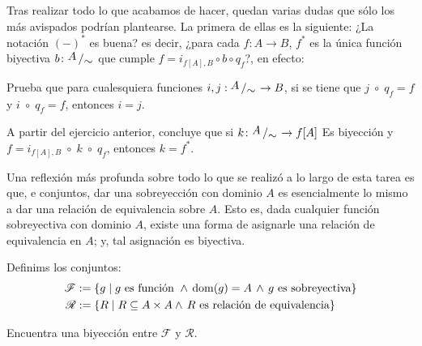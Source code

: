 \documentclass[letterpaper,DIV=14,headsepline,12pt]{scrartcl}
\newcommand{\pts}{}
\newenvironment{ejercicio}[1]{\ifthenelse{\equal{#1}{1} \OR
\equal{#1}{+1}}{\renewcommand{\pts}{\textbf{(#1
pt)}}}{\renewcommand{\pts}{\textbf{(#1 pts)}}}\begin{ejj}\upshape
\pts}{\end{ejj}}
\newcommand{\quot}[2]{{\raisebox{.2em}{$#1$}\left/\raisebox{-.2em}{$#2$}\right.}}
\begin{document}
    Tras realizar todo lo que acabamos de hacer, quedan varias dudas que sólo
    los más avispados podrían plantearse. La primera de ellas es la siguiente:
    ¿La notación $(-)^*$ es buena? es decir, ¿para cada $f\colon A \to B$, $f^*$ es la
    única función biyectiva $b\colon \quot{A}{\sim}$ que cumple $f=i_{f[A],B} \circ b
    \circ q_f$?, en efecto:

    \begin{ejercicio}{+1}
        Prueba que para cualesquiera funciones $i,j:\quot{A}{\sim}\to B$, si se tiene que 
        $ j \; \circ \; q_f = f$ y $ i  \; \circ \; q_f = f$, entonces $i=j$.
    \end{ejercicio}
    
    \begin{ejercicio}{+1}
        A partir del ejercicio anterior, concluye que si $k\colon \quot{A}{\sim} \to f[A]$ Es
        biyección y $f = i_{f[A],B} \; \circ \; k \; \circ \; q_f$, entonces $k=f^*$.
    \end{ejercicio}

    Una reflexión más profunda sobre todo lo que se realizó a lo largo de esta tarea es que, 
    e conjuntos, dar una sobreyección con dominio $A$ es esencialmente lo mismo a dar una
    relación de equivalencia sobre $A$. Esto es, dada cualquier función sobreyectiva con dominio 
    $A$, existe una forma de asignarle una relación de equivalencia
    en $A$; y, tal asignación es biyectiva.
    
    \begin{ejercicio}{+2}
        Definims los conjuntos:
        \begin{align*}
            \mathscr{F} & :=\{ g \mid g \text{ es función } \land \, \operatorname{dom}(g)=A \, \land \, g \text{ es sobreyectiva} \} \\
            \mathscr{R} & :=\{ R \mid R \subseteq A \times A \land \, R \text{ es relación de equivalencia} \}
        \end{align*}

        Encuentra una biyección entre $\mathscr{F}$ y $\mathscr{R}$.
    \end{ejercicio}
\end{document}
